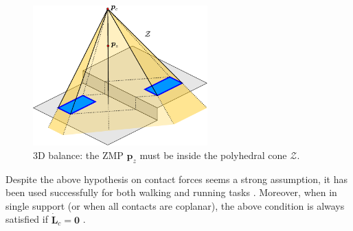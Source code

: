 \begin{figure}
    \centering
    \includegraphics[width=0.6\textwidth]{figures/balance3d.pdf}
    \caption{3D balance: the ZMP $\bm{p}_z$ must be inside the polyhedral cone $\mathcal{Z}$.}
    \label{fig:balance3D}
\end{figure}

Despite the above hypothesis on contact forces seems a strong assumption, it
has been used successfully for both walking and running tasks
\cite{Sugihara2002ICRA,Zamparelli2018SYROCO,Sugihara2021ICRA,Smaldone2022Running}. Moreover, when in
single support (or when all contacts are coplanar), the above condition is
always satisfied if $\dot{\bm{L}}_c=\bm{0}$
\cite{Caron2017DynamicWalkingOverRoughTerrains}.
